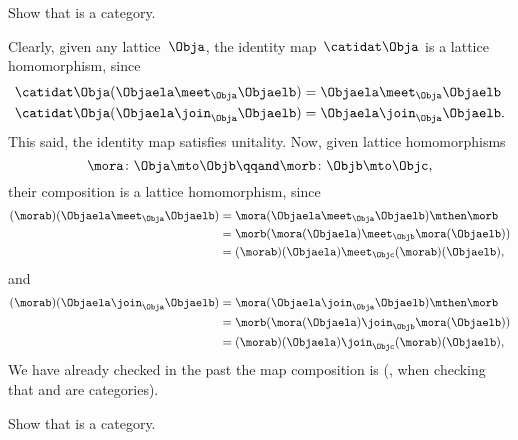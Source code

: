 \begin{exercise}
    \label{ex:lat_is_cat}
    Show that \Lat is a category.
\end{exercise}
\begin{solution}
    Clearly, given any lattice~$\Obja$, the identity map~$\catidat\Obja$ is a lattice homomorphism, since
    \begin{equation}
        \begin{aligned}
            \catidat\Obja(\Objaela \meet_\Obja \Objaelb) & =\Objaela \meet_\Obja \Objaelb \\
            \catidat\Obja(\Objaela \join_\Obja \Objaelb) & =\Objaela \join_\Obja \Objaelb.
        \end{aligned}
    \end{equation}
    This said, the identity map satisfies unitality.
    Now, given lattice homomorphisms
    \begin{equation}
        \mora\colon \Obja \mto \Objb
        \qqand
        \morb\colon \Objb\mto \Objc,
    \end{equation}
    their composition is a lattice homomorphism, since
    \begin{equation}
        \begin{aligned}
            (\morab)(\Objaela \meet_\Obja \Objaelb)
             & = \mora(\Objaela \meet_\Obja \Objaelb) \mthen \morb \\
             & = \morb(\mora(\Objaela) \meet_\Objb \mora(\Objaelb)) \\
             & =(\morab)(\Objaela) \meet_\Objc (\morab)(\Objaelb),
        \end{aligned}
    \end{equation}
    and
    \begin{equation}
        \begin{aligned}
            (\morab)(\Objaela \join_\Obja \Objaelb)
             & = \mora(\Objaela \join_\Obja \Objaelb) \mthen \morb \\
             & = \morb(\mora(\Objaela) \join_\Objb \mora(\Objaelb)) \\
             & =(\morab)(\Objaela) \join_\Objc (\morab)(\Objaelb),
        \end{aligned}
    \end{equation}
    We have already checked in the past the map composition is  (\eg, when checking that \Set and \Pos are categories).
\end{solution}

\begin{exercise}
    \label{ex:boundlat_is_cat}
    Show that \BoundedLat is a category.
\end{exercise}

